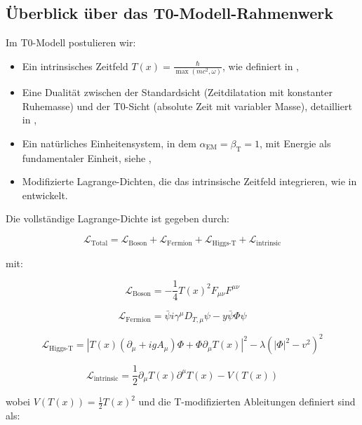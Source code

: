 \documentclass[12pt,a4paper]{article}
\newcommand{\Tfield}{T(x)}
\newcommand{\alphaEM}{\alpha_{\text{EM}}}
\newcommand{\betaT}{\beta_{\text{T}}}
\newcommand{\DhiggsT}{\Tfield (\partial_\mu + ig A_\mu) \Phi + \Phi \partial_\mu \Tfield}
\newcommand{\DTmu}{D_{T,\mu}}
\newcommand{\calL}{\mathcal{L}}
\begin{document}
	\subsection{Überblick über das T0-Modell-Rahmenwerk}
	\label{sec:ueberblick}
	
	Im T0-Modell postulieren wir:
	\begin{itemize}
		\item Ein intrinsisches Zeitfeld $\Tfield = \frac{\hbar}{\max(mc^2, \omega)}$, wie definiert in \cite{pascher_zeit_2025},
		\item Eine Dualität zwischen der Standardsicht (Zeitdilatation mit konstanter Ruhemasse) und der T0-Sicht (absolute Zeit mit variabler Masse), detailliert in \cite{pascher_dualismus_2025},
		\item Ein natürliches Einheitensystem, in dem $\alphaEM = \betaT = 1$, mit Energie als fundamentaler Einheit, siehe \cite{pascher_alpha_2025},
		\item Modifizierte Lagrange-Dichten, die das intrinsische Zeitfeld integrieren, wie in \cite{pascher_lagrange_2025} entwickelt.
	\end{itemize}
	
	Die vollständige Lagrange-Dichte ist gegeben durch:
	
	\begin{equation}
		\calL_{\text{Total}} = \calL_{\text{Boson}} + \calL_{\text{Fermion}} + \calL_{\text{Higgs-T}} + \calL_{\text{intrinsic}}
	\end{equation}
	
	mit:
	
	\begin{equation}
		\calL_{\text{Boson}} = -\frac{1}{4}\Tfield^2 F_{\mu\nu}F^{\mu\nu}
	\end{equation}
	
	\begin{equation}
		\calL_{\text{Fermion}} = \bar{\psi}i\gamma^{\mu}\DTmu\psi - y\bar{\psi}\Phi\psi
	\end{equation}
	
	\begin{equation}
		\calL_{\text{Higgs-T}} = |\DhiggsT|^2 - \lambda(|\Phi|^2 - v^2)^2
	\end{equation}
	
	\begin{equation}
		\calL_{\text{intrinsic}} = \frac{1}{2}\partial_{\mu}\Tfield\partial^{\mu}\Tfield - V(\Tfield)
	\end{equation}
	
	wobei $V(\Tfield) = \frac{1}{2}\Tfield^2$ und die T-modifizierten Ableitungen definiert sind als:
	
\end{document}
